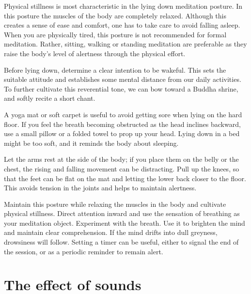 \noindent Physical stillness is most characteristic in the lying down
meditation posture. In this posture the muscles of the body are
completely relaxed. Although this creates a sense of ease and comfort,
one has to take care to avoid falling asleep. When you are physically
tired, this posture is not recommended for formal meditation. Rather,
sitting, walking or standing meditation are preferable as they raise the
body's level of alertness through the physical effort.

\clearpage
\thispagestyle{empty}\mbox{}
\clearpage

Before lying down, determine a clear intention to be wakeful. This sets
the suitable attitude and establishes some mental distance from our
daily activities. To further cultivate this reverential tone, we can bow
toward a Buddha shrine, and softly recite a short chant.

A yoga mat or soft carpet is useful to avoid getting sore when lying on
the hard floor. If you feel the breath becoming obstructed as the head
inclines backward, use a small pillow or a folded towel to prop up your
head. Lying down in a bed might be too soft, and it reminds the body
about sleeping.

Let the arms rest at the side of the body; if you place them on the
belly or the chest, the rising and falling movement can be distracting.
Pull up the knees, so that the feet can be flat on the mat and letting
the lower back closer to the floor. This avoids tension in the joints
and helps to maintain alertness.

Maintain this posture while relaxing the muscles in the body and
cultivate physical stillness. Direct attention inward and use the
sensation of breathing as your meditation object. Experiment with the
breath. Use it to brighten the mind and maintain clear comprehension. If
the mind drifts into dull greyness, drowsiness will follow. Setting a
timer can be useful, either to signal the end of the session, or as a
periodic reminder to remain alert.

\clearpage

\section{The effect of sounds}


